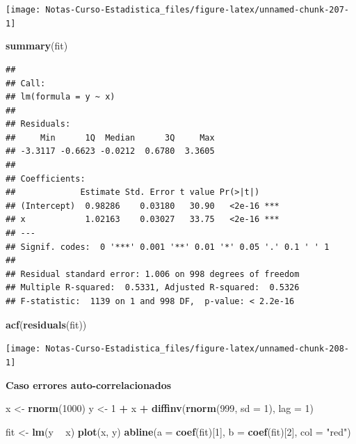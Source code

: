 \documentclass[
  12pt,
]{book}
\newenvironment{Shaded}{\begin{snugshade}}{\end{snugshade}}
\newcommand{\DataTypeTok}[1]{\textcolor[rgb]{0.13,0.29,0.53}{#1}}
\newcommand{\DecValTok}[1]{\textcolor[rgb]{0.00,0.00,0.81}{#1}}
\newcommand{\KeywordTok}[1]{\textcolor[rgb]{0.13,0.29,0.53}{\textbf{#1}}}
\newcommand{\NormalTok}[1]{#1}
\newcommand{\OperatorTok}[1]{\textcolor[rgb]{0.81,0.36,0.00}{\textbf{#1}}}
\newcommand{\StringTok}[1]{\textcolor[rgb]{0.31,0.60,0.02}{#1}}
\theoremstyle{definition}
\theoremstyle{definition}
\theoremstyle{definition}
\theoremstyle{remark}
\begin{document}
\begin{center}\texttt{[image: Notas-Curso-Estadistica\_files/figure-latex/unnamed-chunk-207-1]} \end{center}

\begin{Shaded}
\begin{Highlighting}[]
\KeywordTok{summary}\NormalTok{(fit)}
\end{Highlighting}
\end{Shaded}

\begin{verbatim}
## 
## Call:
## lm(formula = y ~ x)
## 
## Residuals:
##     Min      1Q  Median      3Q     Max 
## -3.3117 -0.6623 -0.0212  0.6780  3.3605 
## 
## Coefficients:
##             Estimate Std. Error t value Pr(>|t|)    
## (Intercept)  0.98286    0.03180   30.90   <2e-16 ***
## x            1.02163    0.03027   33.75   <2e-16 ***
## ---
## Signif. codes:  0 '***' 0.001 '**' 0.01 '*' 0.05 '.' 0.1 ' ' 1
## 
## Residual standard error: 1.006 on 998 degrees of freedom
## Multiple R-squared:  0.5331, Adjusted R-squared:  0.5326 
## F-statistic:  1139 on 1 and 998 DF,  p-value: < 2.2e-16
\end{verbatim}

\begin{Shaded}
\begin{Highlighting}[]
\KeywordTok{acf}\NormalTok{(}\KeywordTok{residuals}\NormalTok{(fit))}
\end{Highlighting}
\end{Shaded}

\begin{center}\texttt{[image: Notas-Curso-Estadistica\_files/figure-latex/unnamed-chunk-208-1]} \end{center}

\textbf{Caso errores auto-correlacionados}

\begin{Shaded}
\begin{Highlighting}[]
\NormalTok{x <-}\StringTok{ }\KeywordTok{rnorm}\NormalTok{(}\DecValTok{1000}\NormalTok{)}
\NormalTok{y <-}\StringTok{ }\DecValTok{1} \OperatorTok{+}\StringTok{ }\NormalTok{x }\OperatorTok{+}\StringTok{ }\KeywordTok{diffinv}\NormalTok{(}\KeywordTok{rnorm}\NormalTok{(}\DecValTok{999}\NormalTok{, }\DataTypeTok{sd =} \DecValTok{1}\NormalTok{), }\DataTypeTok{lag =} \DecValTok{1}\NormalTok{)}
\end{Highlighting}
\end{Shaded}

\begin{Shaded}
\begin{Highlighting}[]
\NormalTok{fit <-}\StringTok{ }\KeywordTok{lm}\NormalTok{(y }\OperatorTok{~}\StringTok{ }\NormalTok{x)}
\KeywordTok{plot}\NormalTok{(x, y)}
\KeywordTok{abline}\NormalTok{(}\DataTypeTok{a =} \KeywordTok{coef}\NormalTok{(fit)[}\DecValTok{1}\NormalTok{], }\DataTypeTok{b =} \KeywordTok{coef}\NormalTok{(fit)[}\DecValTok{2}\NormalTok{], }\DataTypeTok{col =} \StringTok{"red"}\NormalTok{)}
\end{Highlighting}
\end{Shaded}
\end{document}
